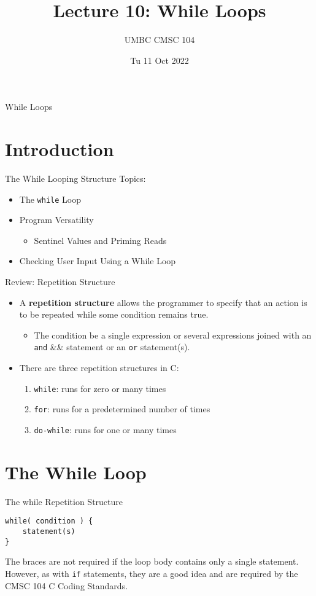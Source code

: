 \documentclass[graphics]{beamer}
\title{Lecture 10: While Loops}
\author{UMBC CMSC 104}
\date{Tu 11 Oct 2022}
\begin{document}
\begin{frame}{}
\centering
    While Loops
\end{frame}

\section*{Introduction}
\begin{frame}{The While Looping Structure}
    Topics:
    \begin{itemize}
        \item The \texttt{while} Loop
        \item Program Versatility
        \begin{itemize}
            \item Sentinel Values and Priming Reads
        \end{itemize}
        \item Checking User Input Using a While Loop
    \end{itemize}
\end{frame}

\begin{frame}{Review: Repetition Structure}
    \begin{itemize}
        \item A \textbf{repetition structure} allows the programmer to specify that an action is to be repeated while some condition remains true.
        \begin{itemize}
            \item The condition be a single expression or several expressions joined with an \texttt{and} \&\& statement or an \texttt{or} \textbar\textbar statement(s). 
        \end{itemize}
        \item There are three repetition structures in C:
        \begin{enumerate}
            \item \texttt{while}: runs for zero or many times
            \item \texttt{for}: runs for a predetermined number of times
            \item \texttt{do-while}: runs for one or many times
        \end{enumerate}
    \end{itemize}
\end{frame}

\section*{The While Loop}
\begin{frame}[fragile]{The while Repetition Structure}
\begin{verbatim}
while( condition ) {
    statement(s)
}
\end{verbatim}
The braces are not required if the loop body contains only a single statement. However, as with \texttt{if} statements, they are a good idea and are required by the CMSC 104 C Coding Standards.
\end{frame}
\end{document}
